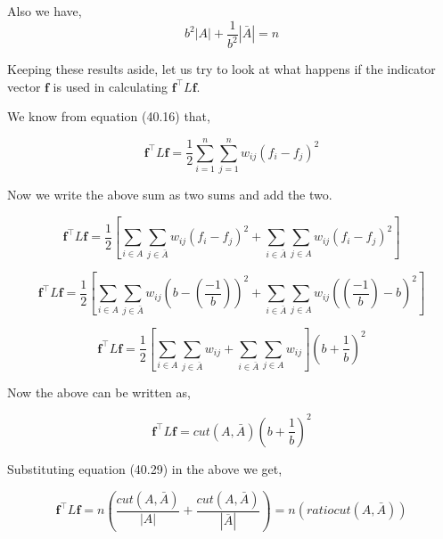 \documentclass[english]{article}
\theoremstyle{plain}
\begin{document}
Also we have,
\begin{equation}
b^{2}\left|A\right| + \frac{1}{b^{2}}\left|\bar{A}\right| = n
\end{equation}

Keeping these results aside, let us try to look at what happens if the indicator vector $\boldsymbol{f}$ is used in calculating $\boldsymbol{f}^{\top}L\boldsymbol{f}$.

We know from equation (40.16) that,

\begin{equation}
\boldsymbol{f}^{\top}L\boldsymbol{f} = 
\frac{1}{2}\sum_{i=1}^{n} \sum_{j=1}^{n}  w_{ij}\left( f_{i} - f_{j} \right)^{2}  
\end{equation}

Now we write the above sum as two sums and add the two.

\begin{equation}
\boldsymbol{f}^{\top}L\boldsymbol{f} = \frac{1}{2} \left[ \sum_{i \in A} \sum_{j \in \bar{A}}  w_{ij}\left( f_{i} - f_{j} \right)^{2} + \sum_{i \in \bar{A}} \sum_{j \in A}  w_{ij}\left( f_{i} - f_{j} \right)^{2}  \right]
\end{equation}

\begin{equation}
\boldsymbol{f}^{\top}L\boldsymbol{f} = \frac{1}{2} \left[ \sum_{i \in A} \sum_{j \in \bar{A}}  w_{ij}\left( b - \left( \frac{-1}{b} \right) \right)^{2} + \sum_{i \in \bar{A}} \sum_{j \in A}  w_{ij}\left( \left( \frac{-1}{b} \right) - b \right)^{2}  \right]
\end{equation}

\begin{equation}
\boldsymbol{f}^{\top}L\boldsymbol{f} = \frac{1}{2} \left[ \sum_{i \in A} \sum_{j \in \bar{A}}  w_{ij} + \sum_{i \in \bar{A}} \sum_{j \in A}  w_{ij}\right] \left( b + \frac{1}{b}\right)^{2}
\end{equation}

Now the above can be written as,

\begin{equation}
\boldsymbol{f}^{\top}L\boldsymbol{f} = cut(A,\bar{A})\left( b + \frac{1}{b}\right)^{2}
\end{equation}

Substituting equation (40.29) in the above we get,

\begin{equation}
\boldsymbol{f}^{\top}L\boldsymbol{f} =  n\left(\frac{cut(A,\bar{A})}{\left|A\right|} + \frac{cut(A,\bar{A})}{\left|\overline{A}\right|}\right)= n(ratiocut(A,\bar{A}))
\end{equation}
\end{document}
